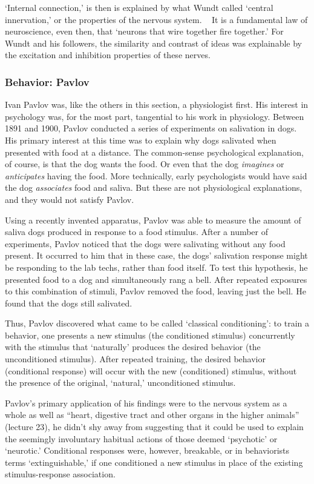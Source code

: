 \begin{refsection}
`Internal connection,' is then is explained by what Wundt called `central innervation,' or the properties of the nervous system. ~\citep{Wundt:1876vu} It is a fundamental law of neuroscience, even then, that `neurons that wire together fire together.' For Wundt and his followers, the similarity and contrast of ideas was explainable by the excitation and inhibition properties of these nerves.

\subsubsection{Behavior: Pavlov}
\label{behavior:pavlov}

Ivan Pavlov was, like the others in this section, a physiologist first. His interest in psychology was, for the most part, tangential to his work in physiology. Between 1891 and 1900, Pavlov conducted a series of experiments on salivation in dogs. His primary interest at this time was to explain why dogs salivated when presented with food at a distance. The common-sense psychological explanation, of course, is that the dog wants the food. Or even that the dog \emph{imagines} or \emph{anticipates} having the food. More technically, early psychologists would have said the dog \emph{associates} food and saliva. But these are not physiological explanations, and they would not satisfy Pavlov.

Using a recently invented apparatus, Pavlov was able to measure the amount of saliva dogs produced in response to a food stimulus. After a number of experiments, Pavlov noticed that the dogs were salivating without any food present. It occurred to him that in these case, the dogs' salivation response might be responding to the lab techs, rather than food itself. To test this hypothesis, he presented food to a dog and simultaneously rang a bell. After repeated exposures to this combination of stimuli, Pavlov removed the food, leaving just the bell. He found that the dogs still salivated.

Thus, Pavlov discovered what came to be called `classical conditioning': to train a behavior, one presents a new stimulus (the conditioned stimulus) concurrently with the stimulus that `naturally' produces the desired behavior (the unconditioned stimulus). After repeated training, the desired behavior (conditional response) will occur with the new (conditioned) stimulus, without the presence of the original, `natural,' unconditioned stimulus.

Pavlov's primary application of his findings were to the nervous system as a whole as well as ``heart, digestive tract and other organs in the higher animals'' (lecture 23), he didn't shy away from suggesting that it could be used to explain the seemingly involuntary habitual actions of those deemed `psychotic' or `neurotic.' Conditional responses were, however, breakable, or in behaviorists terms `extinguishable,' if one conditioned a new stimulus in place of the existing stimulus-response association.


\end{refsection}

